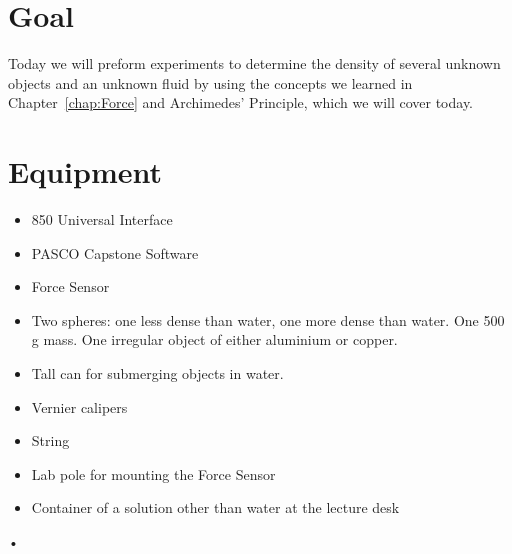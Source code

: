 \documentclass[main.tex]{subfiles}
\begin{document}
\section*{Goal}
Today we will preform experiments to determine the density of several unknown objects and an unknown fluid by using the concepts we learned in Chapter~\ref{chap:Force} and Archimedes' Principle, which we will cover today. 

\section*{Equipment}
\begin{itemize}
\item
850 Universal Interface
\item
PASCO Capstone Software
\item
Force Sensor
\item
Two spheres: one less dense than water, one more dense than water. One 500 g mass. One irregular object of either aluminium or copper.
\item
Tall can for submerging objects in water.
\item
Vernier calipers
\item
String
\item
Lab pole for mounting the Force Sensor
\item
Container of a solution other than water at the lecture desk
\end{itemize}•
\end{document}

